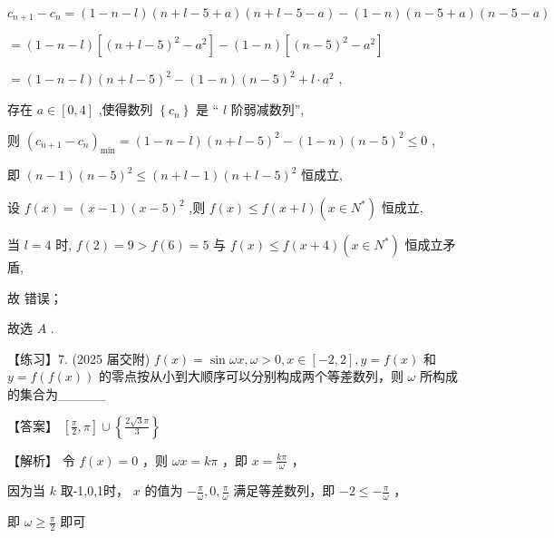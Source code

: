 \documentclass[10pt]{article}
\newcommand*\circled[1]{\tikz[baseline=(char.base)]{\node[shape=circle,draw,inner sep=1.5pt] (char) {\small #1};}}
\begin{document}
\({c}_{n + 1} - {c}_{n} = \left( {1 - n - l}\right) \left( {n + l - 5 + a}\right) \left( {n + l - 5 - a}\right)  - \left( {1 - n}\right) \left( {n - 5 + a}\right) \left( {n - 5 - a}\right)\)

\(= \left( {1 - n - l}\right) \left\lbrack  {{\left( n + l - 5\right) }^{2} - {a}^{2}}\right\rbrack   - \left( {1 - n}\right) \left\lbrack  {{\left( n - 5\right) }^{2} - {a}^{2}}\right\rbrack\)

\(= \left( {1 - n - l}\right) {\left( n + l - 5\right) }^{2} - \left( {1 - n}\right) {\left( n - 5\right) }^{2} + l \cdot  {a}^{2}\) ,

存在 \(a \in  \left\lbrack  {0,4}\right\rbrack\) ,使得数列 \(\left\{  {c}_{n}\right\}\) 是 “ \(l\) 阶弱减数列”,

则 \({\left( {c}_{n + 1} - {c}_{n}\right) }_{\min } = \left( {1 - n - l}\right) {\left( n + l - 5\right) }^{2} - \left( {1 - n}\right) {\left( n - 5\right) }^{2} \leq  0\) ,

即 \(\left( {n - 1}\right) {\left( n - 5\right) }^{2} \leq  \left( {n + l - 1}\right) {\left( n + l - 5\right) }^{2}\) 恒成立,

设 \(f\left( x\right)  = \left( {x - 1}\right) {\left( x - 5\right) }^{2}\) ,则 \(f\left( x\right)  \leq  f\left( {x + l}\right) \left( {x \in  {N}^{ * }}\right)\) 恒成立,

当 \(l = 4\) 时, \(f\left( 2\right)  = 9 > f\left( 6\right)  = 5\) 与 \(f\left( x\right)  \leq  f\left( {x + 4}\right) \left( {x \in  {N}^{ * }}\right)\) 恒成立矛盾,

故 \circled{2} 错误；

故选 \(A\) .

【练习】7. (2025 届交附) \(f\left( x\right)  = \sin {\omega x},\omega  > 0,x \in  \left\lbrack  {-2,2}\right\rbrack  ,y = f\left( x\right)\) 和 \(y = f\left( {f\left( x\right) }\right)\) 的零点按从小到大顺序可以分别构成两个等差数列，则 \(\omega\) 所构成的集合为\_\_\_\_\_

【答案】 \(\left\lbrack  {\frac{\pi }{2},\pi }\right\rbrack   \cup  \left\{  \frac{2\sqrt{3}\pi }{3}\right\}\)

【解析】 \circled{1}  令 \(f\left( x\right)  = 0\) ，则 \({\omega x} = {k\pi }\) ，即 \(x = \frac{k\pi }{\omega }\) ，

因为当 \(k\) 取-1,0,1时， \(x\) 的值为 \(- \frac{\pi }{\omega },0,\frac{\pi }{\omega }\) 满足等差数列，即 \(- 2 \leq   - \frac{\pi }{\omega }\) ，

即 \(\omega  \geq  \frac{\pi }{2}\) 即可
\end{document}
